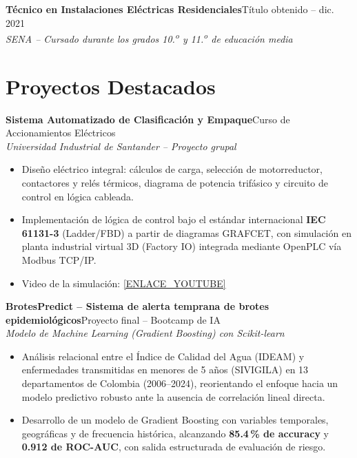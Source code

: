 \documentclass[10pt,a4paper]{article}
\newcommand{\entrada}[3]{%
    \noindent\textbf{\color{primario}#1}\hfill{\small\color{secundario}#2}\\[0pt]
    {\small\itshape\color{secundario}#3}\par\vspace{1pt}%
}
\begin{document}
\entrada{Técnico en Instalaciones Eléctricas Residenciales}{Título obtenido -- dic. 2021}{SENA -- Cursado durante los grados 10.\textsuperscript{o} y 11.\textsuperscript{o} de educación media}

\section*{Proyectos Destacados}

\entrada{Sistema Automatizado de Clasificación y Empaque}{Curso de Accionamientos Eléctricos}{Universidad Industrial de Santander -- Proyecto grupal}
\begin{itemize}
    \item Diseño eléctrico integral: cálculos de carga, selección de motorreductor, contactores y relés térmicos, diagrama de potencia trifásico y circuito de control en lógica cableada.
    \item Implementación de lógica de control bajo el estándar internacional \textbf{IEC 61131-3} (Ladder/FBD) a partir de diagramas GRAFCET, con simulación en planta industrial virtual 3D (Factory IO) integrada mediante OpenPLC vía Modbus TCP/IP.
    \item Video de la simulación: \href{[ENLACE_YOUTUBE]}{[ENLACE\_YOUTUBE]}
\end{itemize}
\vspace{1pt}

\entrada{BrotesPredict -- Sistema de alerta temprana de brotes epidemiológicos}{Proyecto final -- Bootcamp de IA}{Modelo de Machine Learning (Gradient Boosting) con Scikit-learn}
\begin{itemize}
    \item Análisis relacional entre el Índice de Calidad del Agua (IDEAM) y enfermedades transmitidas en menores de 5 años (SIVIGILA) en 13 departamentos de Colombia (2006--2024), reorientando el enfoque hacia un modelo predictivo robusto ante la ausencia de correlación lineal directa.
    \item Desarrollo de un modelo de Gradient Boosting con variables temporales, geográficas y de frecuencia histórica, alcanzando \textbf{85.4\,\% de accuracy} y \textbf{0.912 de ROC-AUC}, con salida estructurada de evaluación de riesgo.
\end{itemize}
\vspace{1pt}
\end{document}
